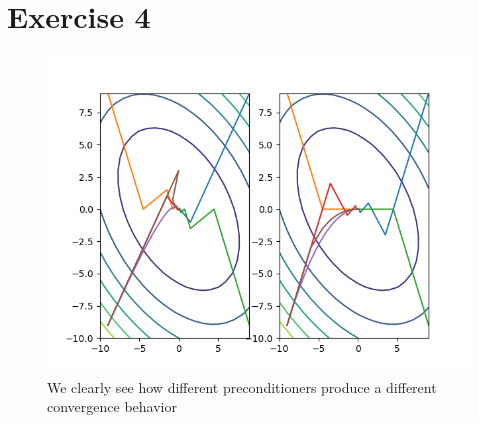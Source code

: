 \documentclass{article}
\begin{document}
\section*{Exercise 4}

\begin{figure}
    \includegraphics[width=\textwidth]{example.png}
    \caption{We clearly see how different preconditioners produce a different convergence behavior}
\end{figure}
\end{document}
